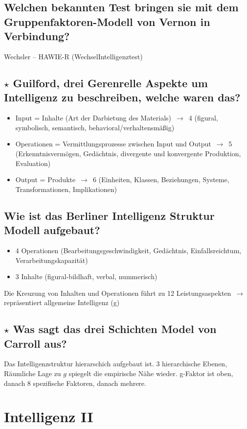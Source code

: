 \documentclass[a4paper,9pt,DIV=14]{scrartcl}
\begin{document}
\subsection{Welchen bekannten Test bringen sie mit dem Gruppenfaktoren-Modell von Vernon in Verbindung?}
Wechsler – HAWIE-R (WechselIntelligenztest)
\subsection{$\star$ Guilford, drei Gerenrelle Aspekte um Intelligenz zu beschreiben, welche waren das?} %
\begin{itemize}
\item Input = Inhalte (Art der Darbietung des Materials) $\,\to\,$ 4 (figural, symbolisch, semantisch, behavioral/verhaltensmäßig)
\item Operationen = Vermittlungsprozesse zwischen Input und Output $\,\to\,$ 5 (Erkenntnisvermögen, Gedächtnis, divergente und konvergente Produktion, Evaluation)
\item Output = Produkte $\,\to\,$ 6 (Einheiten, Klassen, Beziehungen, Systeme, Transformationen, Implikationen)
\end{itemize}
\subsection{Wie ist das Berliner Intelligenz Struktur Modell aufgebaut?}
\begin{itemize}
\item 4 Operationen (Bearbeitungsgeschwindigkeit, Gedächtnis, Einfallsreichtum, Verarbeitungskapazität)
\item 3 Inhalte (figural-bildhaft, verbal, nummerisch)
\end{itemize}
Die Kreuzung von Inhalten und Operationen führt zu 12 Leistungsaspekten $\,\to\,$ repräsentiert allgemeine Intelligenz (g)
\subsection{$\star$ Was sagt das drei Schichten Model von Carroll aus?} %
Das Intelligenzstruktur hierarschich aufgebaut ist. 3 hierarchische Ebenen, Räumliche Lage zu $g$ spiegelt die empirische Nähe wieder. g-Faktor ist oben, danach 8 spezifische Faktoren, danach mehrere.


\section{Intelligenz II}
\end{document}
